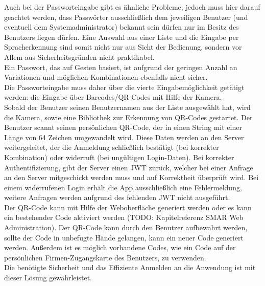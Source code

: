 Auch bei der Passworteingabe gibt es ähnliche Probleme, jedoch muss hier darauf geachtet werden, dass Passwörter ausschließlich dem jeweiligen Benutzer (und eventuell dem Systemadministrator) bekannt sein dürfen \bzw nur im Besitz des Benutzers liegen dürfen. Eine Auswahl aus einer Liste und die Eingabe per Spracherkennung sind somit nicht nur aus Sicht der Bedienung, sondern vor Allem aus Sicherheitsgründen nicht praktikabel.\\
Ein Passwort, das auf Gesten basiert, ist aufgrund der geringen Anzahl an Variationen und möglichen Kombinationen ebenfalls nicht sicher.\\
Die Passworteingabe muss daher über die vierte Eingabemöglichkeit getätigt werden: die Eingabe über Barcodes/QR-Codes mit Hilfe der Kamera.\\

Sobald der Benutzer seinen Benutzernamen aus der Liste ausgewählt hat, wird die Kamera, sowie eine Bibliothek zur Erkennung von QR-Codes gestartet. Der Benutzer scannt seinen persönlichen QR-Code, der in einen String mit einer Länge von 64 Zeichen umgewandelt wird. Diese Daten werden an den Server weitergeleitet, der die Anmeldung schließlich bestätigt (bei korrekter Kombination) oder widerruft (bei ungültigen Login-Daten). Bei korrekter Authentifizierung, gibt der Server einen \ac{JWT} zurück, welcher bei einer Anfrage an den Server mitgeschickt werden muss und auf Korrektheit überprüft wird. Bei einem widerrufenen Login erhält die App ausschließlich eine Fehlermeldung, weitere Anfragen werden aufgrund des fehlenden \ac{JWT} nicht ausgeführt.\\

Der QR-Code kann mit Hilfe der Weboberfläche generiert werden oder es kann ein bestehender Code aktiviert werden (TODO: Kapitelreferenz SMAR Web Administration). Der QR-Code kann durch den Benutzer aufbewahrt werden, sollte der Code in unbefugte Hände gelangen, kann ein neuer Code generiert werden. Außerdem ist es möglich vorhandene Codes, wie \zB ein Code auf der persönlichen Firmen-Zugangskarte des Benutzers, zu verwenden.\\

Die benötigte Sicherheit und das Effiziente Anmelden an die Anwendung ist mit dieser Lösung gewährleistet.

